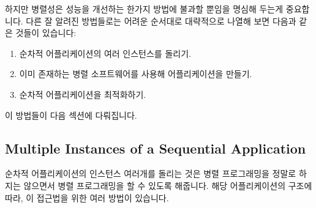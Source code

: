하지만 병렬성은 성능을 개선하는 한가지 방법에 불과할 뿐임을 명심해 두는게
중요합니다.
다른 잘 알려진 방법들로는 어려운 순서대로 대략적으로 나열해 보면 다음과 같은
것들이 있습니다:

\begin{enumerate}
\item	순차적 어플리케이션의 여러 인스턴스를 돌리기.
\item	이미 존재하는 병렬 소프트웨어를 사용해 어플리케이션을 만들기.
\item	순차적 어플리케이션을 최적화하기.

\end{enumerate}

이 방법들이 다음 섹션에 다뤄집니다.

\subsection{Multiple Instances of a Sequential Application}
\label{sec:intro:Multiple Instances of a Sequential Application}

순차적 어플리케이션의 인스턴스 여러개를 돌리는 것은 병렬 프로그래밍을 정말로
하지는 않으면서 병렬 프로그래밍을 할 수 있도록 해줍니다.
해당 어플리케이션의 구조에 따라, 이 접근법을 위한 여러 방법이 있습니다.

